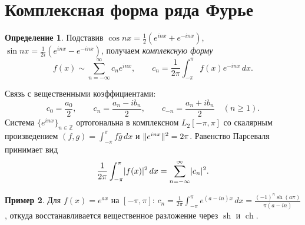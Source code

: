 \documentclass[11pt,a4paper]{article}
\theoremstyle{definition}
\newtheorem{definition}{Определение}[section]
\newtheorem{example}[definition]{Пример}
\theoremstyle{plain}
\newcommand{\Z}{\mathbb{Z}}
\newcommand{\dx}{\,dx}
\renewcommand{\ge}{\geqslant}
\DeclarePairedDelimiter{\abs}{\lvert}{\rvert}
\DeclarePairedDelimiter{\norm}{\lVert}{\rVert}
\begin{document}
\section{Комплексная форма ряда Фурье}

\begin{definition}
Подставив $\cos nx=\tfrac12(e^{inx}+e^{-inx})$, $\sin nx=\tfrac1{2i}(e^{inx}-e^{-inx})$, получаем
\emph{комплексную форму}
\[
  f(x)\sim\sum_{n=-\infty}^{\infty}c_n e^{inx},\qquad
  c_n=\frac1{2\pi}\int_{-\pi}^{\pi}f(x)e^{-inx}\dx .
\]
\end{definition}

Связь с вещественными коэффициентами:
\[
  c_0=\frac{a_0}{2},\qquad c_n=\frac{a_n-ib_n}{2},\qquad c_{-n}=\frac{a_n+ib_n}{2}\quad(n\ge1).
\]
Система $\{e^{inx}\}_{n\in\Z}$ ортогональна в комплексном $L_2[-\pi,\pi]$ со скалярным
произведением $(f,g)=\int_{-\pi}^{\pi}f\bar g\dx$ и $\norm{e^{inx}}^2=2\pi$. Равенство Парсеваля
принимает вид
\[
  \frac1{2\pi}\int_{-\pi}^{\pi}\abs{f(x)}^2\dx=\sum_{n=-\infty}^{\infty}\abs{c_n}^2 .
\]

\begin{example}
Для $f(x)=e^{ax}$ на $[-\pi,\pi]$:
$\displaystyle c_n=\frac1{2\pi}\int_{-\pi}^{\pi}e^{(a-in)x}\dx
=\frac{(-1)^n\operatorname{sh}(a\pi)}{\pi(a-in)}$, откуда восстанавливается вещественное
разложение через $\operatorname{sh}$ и $\operatorname{ch}$.
\end{example}
\end{document}
